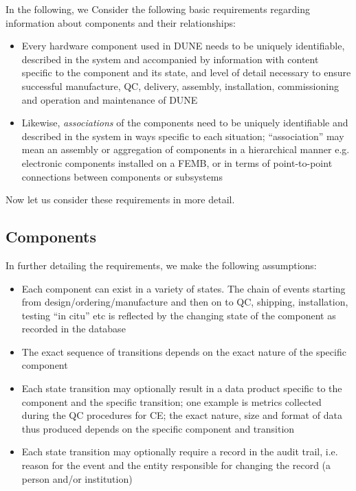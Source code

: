 \documentclass[pdftex,12pt,letter]{article}
\begin{document}
In the following, we 
Consider the following basic requirements regarding information about components and their relationships:

\begin{itemize}

\item Every hardware component used in DUNE needs to be uniquely identifiable, described in the
system and accompanied by information with content specific to the component and its state, and level
of detail necessary to ensure successful manufacture, QC, delivery, assembly, installation, commissioning
and operation and maintenance of DUNE

\item Likewise, \textit{associations} of the components need to be uniquely identifiable and described
in the system in ways specific to each situation; ``association'' may mean an assembly or aggregation of
components in a hierarchical manner e.g.\,electronic components installed on a FEMB, or in terms of
point-to-point connections between components or subsystems

\end{itemize}

\noindent Now let us consider these requirements in more detail.

\subsection{Components}
In further detailing the requirements, we make the following assumptions:

\begin{itemize}

\item Each component can exist in a variety of states. The chain of events starting from design/ordering/manufacture and
then on to QC, shipping, installation, testing ``in citu'' etc is reflected by the changing state of the component as recorded
in the database

\item The exact sequence of transitions depends on the exact nature of the specific  component

\item Each state transition may optionally result in a data product specific to the component and the specific transition;
one example is metrics collected during the QC procedures for CE; the exact nature, size and format of data thus produced
depends on the specific component and transition

\item Each state transition may optionally require a record in the audit trail, i.e.\,reason for the event and the entity
responsible for changing the record (a person and/or institution)

\end{itemize}
\end{document}
